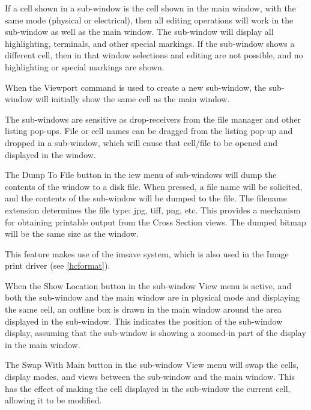 If a cell shown in a sub-window is the cell shown in the main window,
with the same mode (physical or electrical), then all editing
operations will work in the sub-window as well as the main window.  The
sub-window will display all highlighting, terminals, and other special
markings.  If the sub-window shows a different cell, then in that
window selections and editing are not possible, and no highlighting or
special markings are shown.

When the {\cb Viewport} command is used to create a new sub-window, the
sub-window will initially show the same cell as the main window.

The sub-windows are sensitive as drop-receivers from the file manager
and other listing pop-ups.  File or cell names can be dragged from the
listing pop-up and dropped in a sub-window, which will cause that
cell/file to be opened and displayed in the window.

The {\cb Dump To File} button in the {\cb iew} menu of sub-windows will
dump the contents of the window to a disk file.  When pressed, a file
name will be solicited, and the contents of the sub-window will be
dumped to the file.  The filename extension determines the file type: 
jpg, tiff, png, etc.  This provides a mechanism for obtaining
printable output from the {\cb Cross Section} views.  The dumped
bitmap will be the same size as the window.

This feature makes use of the {\vt imsave} system, which is also used
in the Image print driver (see \ref{hcformat}).

When the {\cb Show Location} button in the sub-window {\cb View} menu
is active, and both the sub-window and the main window are in physical
mode and displaying the same cell, an outline box is drawn in the main
window around the area displayed in the sub-window.  This indicates the
position of the sub-window display, assuming that the sub-window is
showing a zoomed-in part of the display in the main window.

The {\cb Swap With Main} button in the sub-window {\cb View} menu will
swap the cells, display modes, and views between the sub-window and the
main window.  This has the effect of making the cell displayed in the
sub-window the current cell, allowing it to be modified.

